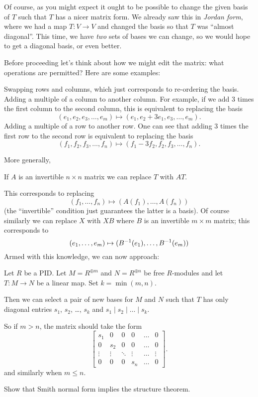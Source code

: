 Of course, as you might expect it ought to be possible to change the
given basis of $T$ such that $T$ has a nicer matrix form.
We already saw this in \emph{Jordan form},
where we had a map $T : V \to V$ and changed the basis
so that $T$ was ``almost diagonal''.
This time, we have \emph{two} sets of bases we can change,
so we would hope to get a diagonal basis, or even better.

Before proceeding let's think about how we might edit the matrix:
what operations are permitted?  Here are some examples:
\begin{itemize}
	\ii Swapping rows and columns, which just corresponds
	to re-ordering the basis.
	\ii Adding a multiple of a column to another column.
	For example, if we add $3$ times the first column to the second column,
	this is equivalent to replacing the basis 
	\[ (e_1, e_2, e_3, \dots, e_m) \mapsto (e_1, e_2+3e_1, e_3, \dots, e_m). \]
	\ii Adding a multiple of a row to another row.
	One can see that adding $3$ times the first row to the second row
	is equivalent to replacing the basis 
	\[ (f_1, f_2, f_3, \dots, f_n) \mapsto (f_1-3f_2, f_2, f_3, \dots, f_n). \]
\end{itemize}
More generally,
\begin{moral}
	If $A$ is an invertible $n \times n$ matrix we can
	replace $T$ with $AT$.
\end{moral}
This corresponds to replacing 
\[ (f_1, \dots, f_n) \mapsto (A(f_1), \dots, A(f_n)) \]
(the ``invertible'' condition just guarantees the latter is a basis).
Of course similarly we can replace $X$ with $XB$
where $B$ is an invertible $m \times m$ matrix;
this corresponds to 
\[ (e_1, \dots, e_m) \mapsto (B^{-1}(e_1), \dots, B^{-1}(e_m)) \]
Armed with this knowledge, we can now approach:
\begin{theorem}
	Let $R$ be a PID.
	Let $M = R^{\oplus m}$ and $N = R^{\oplus n}$ be free $R$-modules
	and let $T : M \to N$ be a linear map.
	Set $k = \min(m,n)$.

	Then we can select a pair of new bases for $M$ and $N$ such that 
	$T$ has only diagonal entries $s_1$, $s_2$, \dots, $s_k$
	and $s_1 \mid s_2 \mid \dots \mid s_k$.
\end{theorem}
So if $m > n$, the matrix should take the form
\[
	\begin{bmatrix} 
		s_1 & 0 & 0 & 0 & \dots & 0 \\
		0 & s_2 & 0 & 0 & \dots & 0 \\
		\vdots & \vdots & \ddots & \vdots & \dots & \vdots \\
		0 & 0 & 0 & s_n & \dots & 0
	\end{bmatrix}.
\]
and similarly when $m \le n$.
\begin{ques}
	Show that Smith normal form implies the structure theorem.
\end{ques}

